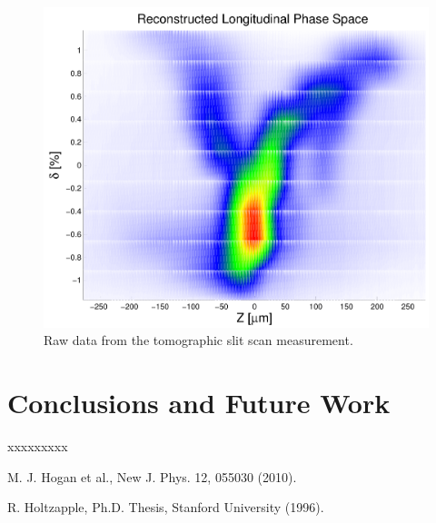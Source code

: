 \documentclass[%
twocolumn,
showpacs,preprintnumbers,
 aps,
prstab,
]{revtex4-1}
\begin{document}
\begin{figure}[hbt]
  \includegraphics[width=\columnwidth]{figures/test.pdf}
  \caption{Raw data from the tomographic slit scan measurement.}
  \label{ps}
\end{figure}




\section{Conclusions and Future Work} \label{sec:con}


xxxxxxxxx






\begin{thebibliography}{99}

 M. J. Hogan et al., New J. Phys. 12, 055030 (2010).

 R. Holtzapple, Ph.D. Thesis, Stanford University (1996).

\end{thebibliography}
\end{document}
